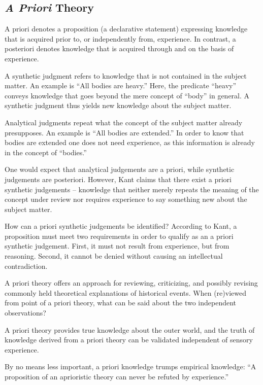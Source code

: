 \subsection{\textit{A Priori} Theory}

A priori denotes a proposition (a declarative statement) expressing knowledge that is acquired prior to, or independently from, experience. In contrast, a posteriori denotes knowledge that is acquired through and on the basis of experience.

A synthetic judgment refers to knowledge that is not contained in the subject matter. An example is ``All bodies are heavy.''  Here, the predicate ``heavy'' conveys knowledge that goes beyond the mere concept of ``body'' in general. A synthetic judgment thus yields new knowledge about the subject matter.

Analytical judgments repeat what the concept of the subject matter already presupposes. An example is ``All bodies are extended.''  In order to know that bodies are extended one does not need experience, as this information is already in the concept of ``bodies.''

One would expect that analytical judgements are a priori, while synthetic judgements are posteriori. However, Kant claims that there exist a priori synthetic judgements – knowledge that neither merely repeats the meaning of the concept under review nor requires experience to say something new about the subject matter.

How can a priori synthetic judgements be identified?  According to Kant, a proposition must meet two requirements in order to qualify as an a priori synthetic judgement. First, it must not result from experience, but from reasoning. Second, it cannot be denied without causing an intellectual contradiction.

A priori theory offers an approach for reviewing, criticizing, and possibly revising commonly held theoretical explanations of historical events. When (re)viewed from point of a priori theory, what can be said about the two independent observations?

A priori theory provides true knowledge about the outer world, and the truth of knowledge derived from a priori theory can be validated independent of sensory experience.

By no means less important, a priori knowledge trumps empirical knowledge: ``A proposition of an aprioristic theory can never be refuted by experience.''

